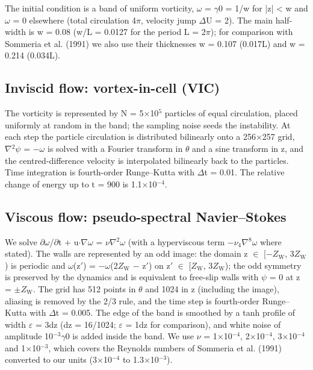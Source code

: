 \documentclass[11pt]{article}
\begin{document}
The initial condition is a band of uniform vorticity, $\omega{}$ = $\gamma{}$0 = 1/w for |z| < w and $\omega{}$ = 0 elsewhere (total circulation 4$\pi{}$, velocity jump $\Delta{}$U = 2). The main half-width is w = 0.08 (w/L = 0.0127 for the period L = 2$\pi{}$); for comparison with Sommeria et al. (1991) we also use their thicknesses w = 0.107 (0.017L) and w = 0.214 (0.034L).

\subsection{Inviscid flow: vortex-in-cell (VIC)}
The vorticity is represented by N = 5$\times{}$10$^{5}$ particles of equal circulation, placed uniformly at random in the band; the sampling noise seeds the instability. At each step the particle circulation is distributed bilinearly onto a 256$\times{}$257 grid, $\nabla{}^{2}\psi{}$ = $-\omega{}$ is solved with a Fourier transform in $\theta{}$ and a sine transform in z, and the centred-difference velocity is interpolated bilinearly back to the particles. Time integration is fourth-order Runge--Kutta with $\Delta{}$t = 0.01. The relative change of energy up to t = 900 is 1.1$\times{}$10$^{-4}$.

\subsection{Viscous flow: pseudo-spectral Navier--Stokes}
We solve $\partial{}\omega{}$/$\partial{}$t + u$\cdot{}\nabla{}\omega{}$ = $\nu{}\nabla{}^{2}\omega{}$ (with a hyperviscous term $-\nu_{4}{}\nabla{}^{8}\omega{}$ where stated). The walls are represented by an odd image: the domain z $\in{}$ [$-Z_{\mathrm{W}}$, 3$Z_{\mathrm{W}}$) is periodic and $\omega{}$(z$\prime{}$) = $-\omega{}$(2$Z_{\mathrm{W}}$ $-$ z$\prime{}$) on z$\prime{}$ $\in{}$ [$Z_{\mathrm{W}}$, 3$Z_{\mathrm{W}}$); the odd symmetry is preserved by the dynamics and is equivalent to free-slip walls with $\psi{}$ = 0 at z = $\pm{}Z_{\mathrm{W}}$. The grid has 512 points in $\theta{}$ and 1024 in z (including the image), aliasing is removed by the 2/3 rule, and the time step is fourth-order Runge--Kutta with $\Delta{}$t = 0.005. The edge of the band is smoothed by a tanh profile of width $\varepsilon{}$ = 3dz (dz = 16/1024; $\varepsilon{}$ = 1dz for comparison), and white noise of amplitude 10$^{-3}\gamma{}$0 is added inside the band. We use $\nu{}$ = 1$\times{}$10$^{-4}$, 2$\times{}$10$^{-4}$, 3$\times{}$10$^{-4}$ and 1$\times{}$10$^{-3}$, which covers the Reynolds numbers of Sommeria et al. (1991) converted to our units (3$\times{}$10$^{-4}$ to 1.3$\times{}$10$^{-3}$).
\end{document}
